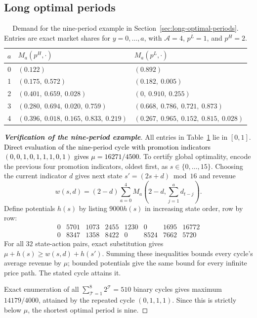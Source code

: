 \begingroup\color{black}
\subsection{Long optimal periods}
\label{app:long-optimal-periods}

\begin{table}[ht]
\centering\small
\caption{Demand for the nine-period example in Section~\ref{sec:long-optimal-periods}. Entries are exact market shares for \(y=0,\ldots,a\), with \(\mathcal A=4\), \(p^L=1\), and \(p^H=2\).}
\label{tab:long-period-demand}
\begin{tabular}{cll}
\toprule
\(a\)&\(M_a(p^H,\cdot)\)&\(M_a(p^L,\cdot)\)\\
\midrule
0&\((0.122)\)&\((0.892)\)\\
1&\((0.175,\ 0.572)\)&\((0.182,\ 0.005)\)\\
2&\((0.401,\ 0.659,\ 0.028)\)&\((0,\ 0.910,\ 0.255)\)\\
3&\((0.280,\ 0.694,\ 0.020,\ 0.759)\)&\((0.668,\ 0.786,\ 0.721,\ 0.873)\)\\
4&\((0.396,\ 0.018,\ 0.165,\ 0.833,\ 0.219)\)&\((0.267,\ 0.965,\ 0.152,\ 0.815,\ 0.028)\)\\
\bottomrule
\end{tabular}
\end{table}

\begin{proof}[\normalfont\bfseries Verification of the nine-period example]
All entries in Table~\ref{tab:long-period-demand} lie in \([0,1]\). \textcolor{black}{Direct evaluation of the nine-period cycle with promotion indicators \((0,0,1,0,1,1,1,0,1)\) gives \(\mu=16271/4500\).} To certify global optimality, encode the previous four promotion indicators, oldest first, as \(s\in\{0,\ldots,15\}\). Choosing the current indicator \(d\) gives next state \(s'=(2s+d)\bmod16\) and revenue
\[
 w(s,d)=(2-d)\sum_{a=0}^4
 M_a\!\left(2-d,\sum_{j=1}^a d_{t-j}\right).
\]
Define potentials \(h(s)\) by listing \(9000h(s)\) in increasing state order, row by row:
\[
\begin{array}{rrrrrrrr}
0&5701&1073&2455&1230&0&1695&16772\\
0&8347&1358&8422&0&8524&7662&5720
\end{array}
\]
For all \(32\) state-action pairs, exact substitution gives
\(\mu+h(s)\ge w(s,d)+h(s')\).
Summing these inequalities bounds every cycle's average revenue by \(\mu\); bounded potentials give the same bound for every infinite price path. The stated cycle attains it.

Exact enumeration of all \(\sum_{\mathcal T=1}^8 2^{\mathcal T}=510\) binary cycles gives maximum \(14179/4000\), attained by the repeated cycle \((0,1,1,1)\). Since this is strictly below \(\mu\), the shortest optimal period is nine.
\end{proof}

